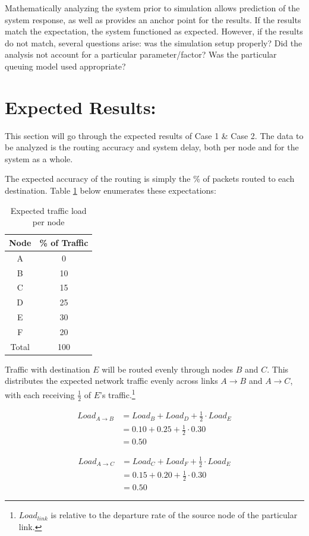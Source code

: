 \documentclass{article}
\begin{document}
Mathematically analyzing the system prior to simulation allows prediction of the system response, as well as provides an anchor point for the results.
If the results match the expectation, the system functioned as expected.
However, if the results do not match, several questions arise:  was the simulation setup properly? Did the analysis not account for a particular parameter/factor?  
Was the particular queuing model used appropriate?

\section{Expected Results:}
\label{sec:ExpectedResults}
This section will go through the expected results of Case 1 \& Case 2.
The data to be analyzed is the routing accuracy and system delay, both per node and for the system as a whole.

The expected accuracy of the routing is simply the \% of packets routed to each destination.  Table \ref{tab:expTrafficLoad} below enumerates these expectations:

\begin{table}[h!]
\centering
\begin{tabular}{|c|c|} \hline
\textbf{Node} & \textbf{\% of Traffic} \\ \hline
A & 0 \\ \hline
B & 10 \\ \hline
C & 15 \\ \hline
D & 25 \\ \hline
E & 30 \\ \hline
F & 20 \\ \hline
Total & 100 \\ \hline
\end{tabular}
\caption{Expected traffic load per node}
\label{tab:expTrafficLoad}
\end{table}


Traffic with destination $E$ will be routed evenly through nodes $B$ and $C$.
This distributes the expected network traffic evenly across links $A \rightarrow B$ and $A \rightarrow C$, with each receiving $\frac{1}{2}$ of $E$'s traffic.\footnote{$Load_{link}$ is relative to the departure rate of the source node of the particular link.}

\begin{minipage}{.5\textwidth}
\begin{align*}
Load_{A \rightarrow B} 	&= Load_B + Load_D + \frac{1}{2} \cdot Load_E \\
						&= 0.10 + 0.25 + \frac{1}{2} \cdot 0.30 \\
						&= 0.50
\end{align*}
\vspace{.25cm}
\end{minipage}
\begin{minipage}{.5\textwidth}
\begin{align*}
Load_{A \rightarrow C} 	&= Load_C + Load_F + \frac{1}{2} \cdot Load_E \\
						&= 0.15 + 0.20 + \frac{1}{2} \cdot 0.30 \\
						&= 0.50
\end{align*}
\vspace{.25cm}
\end{minipage}
\end{document}
